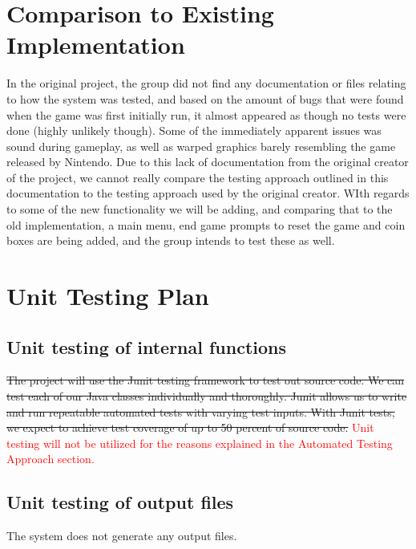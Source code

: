 \documentclass[12pt, titlepage]{article}
\begin{document}
\section{Comparison to Existing Implementation}

In the original project, the group did not find any documentation or files relating to how the system was tested, and based on the amount of bugs that were found when the game was first initially run, it almost appeared as though no tests were done (highly unlikely though). Some of the immediately apparent issues was sound during gameplay, as well as warped graphics barely resembling the game released by Nintendo. Due to this lack of documentation from the original creator of the project, we cannot really compare the testing approach outlined in this documentation to the testing approach used by the original creator. WIth regards to some of the new functionality we will be adding, and comparing that to the old implementation, a main menu, end game prompts to reset the game and coin boxes are being added, and the group intends to test these as well.

\section{Unit Testing Plan}

\subsection{Unit testing of internal functions}

\st{The project will use the Junit testing framework to test out source code. We can test each of our Java classes individually and thoroughly. Junit allows us to write and run repeatable automated tests with varying test inputs. With Junit tests, we expect to achieve test coverage of up to 50 percent of source code.} \textcolor{red}{Unit testing will not be utilized for the reasons explained in the Automated Testing Approach section.}

\subsection{Unit testing of output files}

The system does not generate any output files.





\newpage
\end{document}
